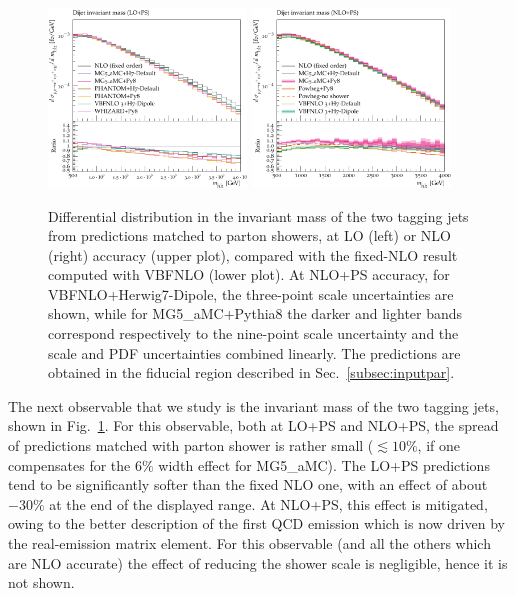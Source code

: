 \documentclass[twocolumn,epjc3]{svjour3} %
\newlength{\width}
\begin{document}
\begin{figure}
\centering
\includegraphics[width=0.47\textwidth]{figures/LOPS/m_jj.pdf}
\includegraphics[width=0.47\textwidth]{figures/NLOPS/m_jj.pdf}
\caption{Differential distribution in the
invariant mass of the two tagging jets
from predictions matched to parton showers, at LO (left) or NLO (right) accuracy (upper plot), compared with the fixed-NLO result computed with {\sc VBFNLO} (lower plot). At NLO+PS accuracy, for
    {\sc VBFNLO}+{\sc Herwig7-Dipole}, the three-point scale uncertainties are shown, while for {\sc MG5\_aMC}+{\sc Pythia8} the darker and lighter bands correspond
    respectively to the nine-point scale uncertainty and the scale and PDF uncertainties combined linearly.
    The predictions are obtained in the fiducial region described in Sec.~\protect\ref{subsec:inputpar}.}
\label{fig:PSmjj}
\end{figure}

The next observable that we study is the invariant mass of the two tagging jets, shown in Fig.~\ref{fig:PSmjj}. For this observable, both at LO+PS and NLO+PS,
the spread of predictions matched with parton shower is rather small
($\lesssim 10\%$, if one compensates for the $6\%$ width effect for {\sc MG5\_aMC}).
The LO+PS predictions tend to be significantly softer than the fixed NLO one, with an effect of
about $-30\%$ at the end of the displayed range. At NLO+PS, this effect is mitigated, owing to the better description of the first QCD emission which is now driven by the real-emission matrix element.
For this observable (and all the others which are NLO accurate) the effect of reducing the shower scale is negligible, hence it is not shown.
\end{document}

